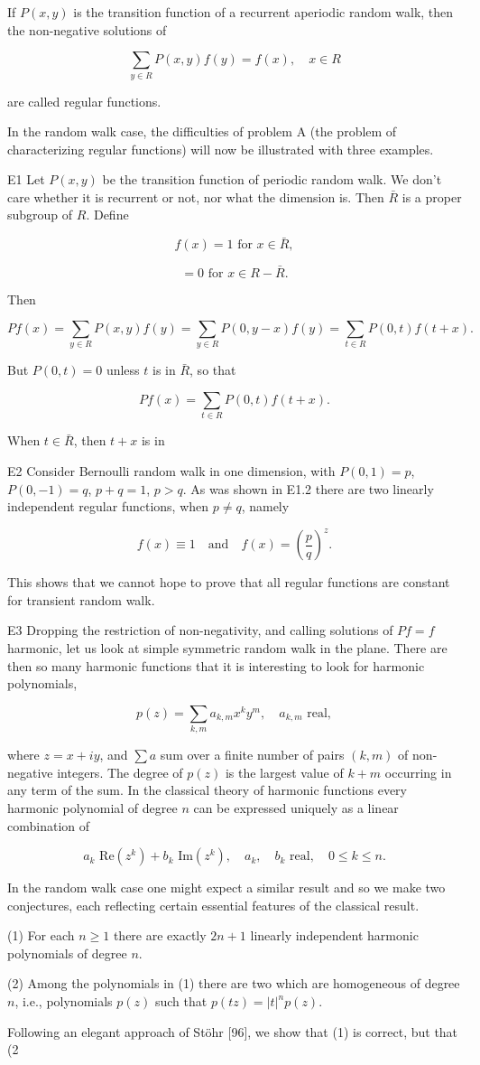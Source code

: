If $P(x,y)$ is the transition function of a recurrent aperiodic random walk, then the non-negative solutions of

$$\sum_{y \in R} P(x,y)f(y) = f(x), \quad x \in R$$

are called regular functions.

In the random walk case, the difficulties of problem A (the problem of characterizing regular functions) will now be illustrated with three examples.

E1 Let $P(x,y)$ be the transition function of periodic random walk. We don't care whether it is recurrent or not, nor what the dimension is. Then $\bar{R}$ is a proper subgroup of $R$. Define

$$f(x) = 1 \text{ for } x \in \bar{R},$$

$$= 0 \text{ for } x \in R - \bar{R}.$$

Then

$$Pf(x) = \sum_{y \in R} P(x,y)f(y) = \sum_{y \in R} P(0,y-x)f(y) = \sum_{t \in R} P(0,t)f(t+x).$$

But $P(0,t) = 0$ unless $t$ is in $\bar{R}$, so that

$$Pf(x) = \sum_{t \in R} P(0,t)f(t+x).$$

When $t \in \bar{R}$, then $t + x$ is in

E2 Consider Bernoulli random walk in one dimension, with $P(0,1) = p$, $P(0,-1) = q$, $p + q = 1$, $p > q$. As was shown in E1.2 there are two linearly independent regular functions, when $p \neq q$, namely

$$f(x) \equiv 1 \quad \text{and} \quad f(x) = \left( \frac{p}{q} \right)^z.$$

This shows that we cannot hope to prove that all regular functions are constant for transient random walk.

E3 Dropping the restriction of non-negativity, and calling solutions of $Pf = f$ harmonic, let us look at simple symmetric random walk in the plane. There are then so many harmonic functions that it is interesting to look for harmonic polynomials,

$$p(z) = \sum_{k,m} a_{k,m} x^k y^m, \quad a_{k,m} \text{ real},$$

where $z = x + iy$, and $\sum a$ sum over a finite number of pairs $(k,m)$ of non-negative integers. The degree of $p(z)$ is the largest value of $k + m$ occurring in any term of the sum. In the classical theory of harmonic functions every harmonic polynomial of degree $n$ can be expressed uniquely as a linear combination of

$$a_k \text{ Re} (z^k) + b_k \text{ Im} (z^k), \quad a_k, \quad b_k \text{ real}, \quad 0 \leq k \leq n.$$

In the random walk case one might expect a similar result and so we make two conjectures, each reflecting certain essential features of the classical result.

(1) For each $n \geq 1$ there are exactly $2n + 1$ linearly independent harmonic polynomials of degree $n$.

(2) Among the polynomials in (1) there are two which are homogeneous of degree $n$, i.e., polynomials $p(z)$ such that $p(tz) = |t|^n p(z)$.

Following an elegant approach of Stöhr [96], we show that (1) is correct, but that (2